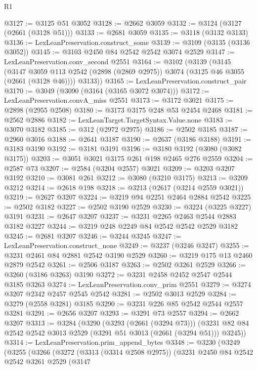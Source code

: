 \begin{lexlean}{R1}
\begin{coremodule}
{{{{{{{{{{{{{{{{{{{{{{{{{{{{{{{{{{{{{{{{@3127 := @3125 @51 @3052
@3128 := @2662 @3059
@3132 := @3124 (@3127 (@2661 (@3128 @51)))
@3133 := @2681 @3059
@3135 := @3118 (@3132 @3133)
@3136 := LexLeanPreservation.construct_some
@3139 := @3109 (@3135 (@3136 @3052))
@3145 := @3103 @2450 @84 @2542 @2542 @3074 @2529
@3147 := LexLeanPreservation.conv_second @2551
@3164 := @3102
    (@3139
      (@3145
        (@3147 @3059 @113 @2542 (@2898 (@2869 @2975)) @3074 (@3125 @46 @3055 (@2661 (@3128 @46))))
        @3133))
@3165 := LexLeanPreservation.construct_pair
@3170 := @3049 (@3090 (@3164 (@3165 @3072 @3074)))
@3172 := LexLeanPreservation.convA_miss @2551
@3173 := @3172 @3021
@3175 := @2898 (@2955 @2508)
@3180 := @3173 @3175 @248 @53 @2454 @2468
@3181 := @2562 @2886
@3182 := LexLeanTarget.TargetSyntax.Value.none
@3183 := @3070 @3182
@3185 := @312 (@2972 @2975)
@3186 := @2502 @3185
@3187 := @2960 @3016
@3188 := @2641 @3187
@3190 := @2637 (@3186 @3188)
@3191 := @3183 @3190
@3192 := @3181 @3191
@3196 := @3180 @3192 (@3080 (@3082 @3175))
@3203 := @3051 @3021 @3175 @261 @198 @2465 @276 @2559
@3204 := @2587 @73
@3207 := @2584 (@3204 @2557) @3021
@3209 := @3203 @3207 @3192
@3210 := @3081 @261
@3212 := @3080 (@3210 @3175)
@3213 := @3209 @3212
@3214 := @2618 @198
@3218 := @3213 (@2617 (@3214 @2559 @3021))
@3219 := @2627 @3207
@3224 := @3219 @94 @2251 @2464 @2884 @2542
@3225 := @2502 @3182
@3227 := @2502 @3190 @2529
@3230 := @3224 (@3225 @3227) @3191
@3231 := @2647 @3207
@3237 := @3231 @2265 @2463 @2544 @2883 @3182 @3227
@3244 := @3219 @248 @2249 @84 @2542 @2542 @2529 @3182
@3245 := @2681 @3207
@3246 := @3244 @3245
@3247 := LexLeanPreservation.construct_none
@3249 := @3237 (@3246 @3247)
@3255 := @3231 @2461 @84 @2881 @2542 @3190 @2529
@3260 := @3219 @175 @13 @2460 @2879 @2542
@3261 := @2506 @3187
@3263 := @2502 @3261 @2529
@3266 := @3260 (@3186 @3263) @3190
@3272 := @3231 @2458 @2452 @2547 @2544 @3185 @3263
@3274 := LexLeanPreservation.conv_prim @2551
@3279 := @3274 @3207 @2342 @2457 @2545 @2542
@3281 := @2502 @3013 @2529
@3284 := @3279 (@2558 @3281) @3185
@3290 := @3231 @226 @85 @2542 @2544 @2557 @3281
@3291 := @2656 @3207
@3293 := @3291 @73 @2557
@3294 := @2662 @3207
@3313 := @3284
    (@3290
      (@3293 (@2661 (@3294 @73)))
      (@3231 @82 @84 @2542 @2542 @3013 @2529 (@3291 @51 @3013 (@2661 (@3294 @51))) @3245))
@3314 := LexLeanPreservation.prim_append_bytes
@3348 := @3230
    (@3249
      (@3255
        (@3266
          (@3272
            (@3313 (@3314 @2508 @2975))
            (@3231
              @2450
              @84
              @2542
              @2542
              @3261
              @2529
              (@3147
}}}}}}}}}}}}}}}}}}}}}}}}}}}}}}}}}}}}}}}}
\end{coremodule}
\end{lexlean}
